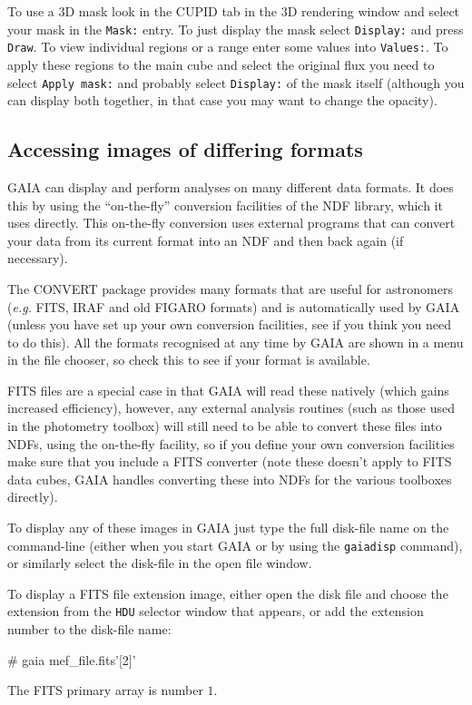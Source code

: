 \documentclass[twoside,11pt,nolof]{starlink}
\providecommand{\mytt}[1]{{\texttt{#1}}}
\begin{document}
To use a 3D mask look in the CUPID tab in the 3D rendering window and select
your mask in the \mytt{Mask:} entry. To just display the mask select
\mytt{Display:} and press \mytt{Draw}. To view individual regions or a
range enter some values into \mytt{Values:}. To apply these regions to the
main cube and select the original flux you need to select \mytt{Apply mask:}
and probably select \mytt{Display:} of the mask itself (although you can
display both together, in that case you may want to change the opacity).

\subsection{Accessing images of differing formats}

GAIA can display and perform analyses on many different data
formats. It does this by using the ``on-the-fly'' conversion
facilities of the NDF library, which it uses directly. This on-the-fly
conversion uses external programs that can convert your data from its
current format into an NDF and then back again (if necessary).

The CONVERT  package provides many formats
that are useful for astronomers (\textit{e.g.} FITS, IRAF and old FIGARO
formats) and is automatically used by GAIA (unless you have set up
your own conversion facilities, see  if you
think you need to do this). All the formats recognised at any time by
GAIA are shown in a menu in the file chooser, so check this to see
if your format is available.

FITS files are a special case in that GAIA will read these natively
(which gains increased efficiency), however, any external analysis
routines (such as those used in the photometry toolbox) will still
need to be able to convert these files into NDFs, using the on-the-fly
facility, so if you define your own conversion facilities make sure
that you include a FITS converter (note these doesn't apply to FITS
data cubes, GAIA handles converting these into NDFs for the various
toolboxes directly).

To display any of these images in GAIA just type the full disk-file
name on the command-line (either when you start GAIA or by using the
\mytt{gaiadisp} command), or similarly select the disk-file in the
open file window.

To display a FITS file extension image, either open the disk file and
choose the extension from the \mytt{HDU} selector window that appears,
or add the extension number to the disk-file name:
\begin{terminalv}
# gaia mef_file.fits'[2]'
\end{terminalv}
The FITS primary array is number $1$.
\end{document}
